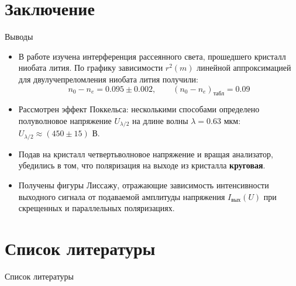 \documentclass[11pt]{beamer} %
\begin{document}
\section{Заключение}

\begin{frame}{Выводы}
    \begin{itemize}
        \item В работе изучена интерференция рассеянного света, прошедшего кристалл ниобата лития. По графику зависимости $r^2(m)$ линейной аппроксимацией для двулучепреломления ниобата лития получили:
        $$ \boxed{n_0 - n_e = 0.095 \pm 0.002, \qquad (n_0 - n_e)_\text{табл} = 0.09}$$

        \item Рассмотрен эффект Поккельса: несколькими способами определено полуволновое напряжение $U_{\lambda/2}$ на длине волны $\lambda = 0.63 \text{ мкм}$: $U_{\lambda/2} \approx (450 \pm 15)$ В. 

        \item Подав на кристалл четвертьволновое напряжение и вращая анализатор, убедились в том, что поляризация на выходе из кристалла \textbf{круговая}.
        
        \item Получены фигуры Лиссажу, отражающие зависимость интенсивности выходного сигнала от подаваемой амплитуды напряжения $I_\text{вых}(U)$ при скрещенных и параллельных поляризациях.
       
    \end{itemize}
\end{frame}

\section{Список литературы}
\begin{frame}{Список литературы}
    \printbibliography
\end{frame}
\end{document}
